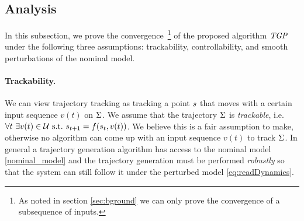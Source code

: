 


\subsection{Analysis}\label{sec:analysis}

In this subsection, we prove the convergence~\footnote{As noted in section \ref{sec:bground} we can only prove the convergence of a subsequence of inputs.} of the proposed algorithm $\emph{TGP}$ under the following three assumptions: trackability, controllability, and smooth perturbations of the nominal model.

\paragraph{Trackability.} We can view trajectory tracking as tracking a point $s$ that moves with a certain input sequence $v(t)$ on $\Sigma$. We assume that the trajectory $\Sigma$ is \emph{trackable}, i.e. $\forall t \ \exists{v(t)} \in \mathcal{U} \ \text{s.t.} \ \traj_{t+1} = \dynamics(\traj_t,v(t))$. We believe this is a fair assumption to make, otherwise no algorithm can come up with an input sequence $v(t)$ to track $\Sigma$. In general a trajectory generation algorithm has access to the nominal model \eqref{nominal_model} and the trajectory generation must be performed \emph{robustly} so that the system can still follow it under the perturbed model \eqref{eq:readDynamics}.

